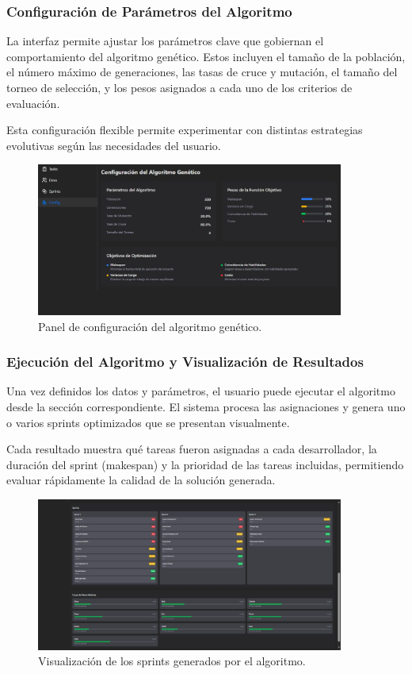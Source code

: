 \subsubsection{Configuración de Parámetros del Algoritmo}
La interfaz permite ajustar los parámetros clave que gobiernan el comportamiento del algoritmo genético. Estos incluyen el tamaño de la población, el número máximo de generaciones, las tasas de cruce y mutación, el tamaño del torneo de selección, y los pesos asignados a cada uno de los criterios de evaluación.

Esta configuración flexible permite experimentar con distintas estrategias evolutivas según las necesidades del usuario.

\begin{figure}[htbp]
    \centering
    \includegraphics[width=0.9\textwidth]{imagenes/web-config.png}
    \caption{Panel de configuración del algoritmo genético.}
    \label{fig:config}
\end{figure}

\subsubsection{Ejecución del Algoritmo y Visualización de Resultados}
Una vez definidos los datos y parámetros, el usuario puede ejecutar el algoritmo desde la sección correspondiente. El sistema procesa las asignaciones y genera uno o varios sprints optimizados que se presentan visualmente.

Cada resultado muestra qué tareas fueron asignadas a cada desarrollador, la duración del sprint (makespan) y la prioridad de las tareas incluidas, permitiendo evaluar rápidamente la calidad de la solución generada.

\begin{figure}[htbp]
    \centering
    \includegraphics[width=0.9\textwidth]{imagenes/web-sprints.png}
    \caption{Visualización de los sprints generados por el algoritmo.}
    \label{fig:resultados}
\end{figure}

